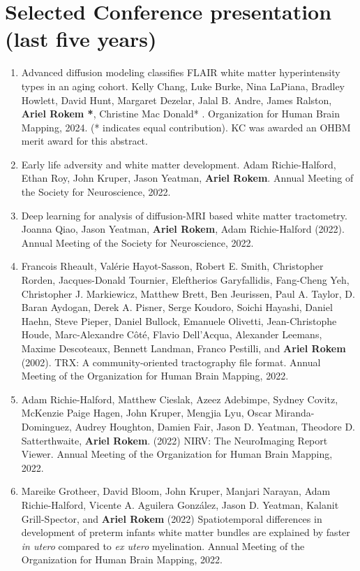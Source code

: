 \documentclass[11pt,fullpage]{article}
\begin{document}
\section*{Selected Conference presentation (last five years)}
\begin{enumerate}
\item Advanced diffusion modeling classifies FLAIR white matter hyperintensity types in an aging cohort. Kelly Chang, Luke Burke, Nina LaPiana, Bradley Howlett, David Hunt, Margaret
Dezelar, Jalal B. Andre, James Ralston, {\bf Ariel Rokem *}, Christine Mac Donald* . Organization for Human Brain Mapping, 2024. (* indicates equal contribution). KC was awarded an OHBM merit award for this abstract.

\item Early life adversity and white matter development. Adam Richie-Halford, Ethan Roy, John Kruper, Jason Yeatman, {\bf Ariel Rokem}. Annual Meeting of the Society for Neuroscience, 2022.

\item Deep learning for analysis of diffusion-MRI based white matter tractometry. Joanna Qiao, Jason Yeatman, {\bf Ariel Rokem}, Adam Richie-Halford (2022). Annual Meeting of the Society for Neuroscience, 2022.

\item Francois Rheault, Val\'{e}rie Hayot-Sasson, Robert E. Smith, Christopher Rorden, Jacques-Donald Tournier, Eleftherios Garyfallidis, Fang-Cheng Yeh, Christopher J. Markiewicz, Matthew Brett, Ben Jeurissen, Paul A. Taylor, D. Baran Aydogan, Derek A. Pisner, Serge Koudoro, Soichi Hayashi, Daniel Haehn, Steve Pieper, Daniel Bullock, Emanuele Olivetti, Jean-Christophe Houde, Marc-Alexandre C\^{o}t\'{e}, Flavio Dell’Acqua, Alexander Leemans, Maxime Descoteaux, Bennett Landman, Franco Pestilli, and {\bf Ariel Rokem} (2002). TRX: A community-oriented tractography file format. Annual Meeting of the Organization for Human Brain Mapping, 2022.

\item Adam Richie-Halford, Matthew Cieslak, Azeez Adebimpe, Sydney Covitz, McKenzie Paige Hagen, John Kruper, Mengjia Lyu, Oscar Miranda-Dominguez, Audrey Houghton, Damien Fair, Jason D. Yeatman, Theodore D. Satterthwaite, {\bf Ariel Rokem}. (2022) NIRV: The NeuroImaging Report Viewer. Annual Meeting of the Organization for Human Brain Mapping, 2022.

\item Mareike Grotheer, David Bloom, John Kruper, Manjari Narayan, Adam Richie-Halford, Vicente A. Aguilera González, Jason D. Yeatman, Kalanit Grill-Spector, and {\bf Ariel Rokem} (2022) Spatiotemporal differences in development of preterm infants white matter bundles are explained by faster \emph{in utero} compared to \emph{ex utero} myelination. Annual Meeting of the Organization for Human Brain Mapping, 2022.


\end{enumerate}
\end{document}
